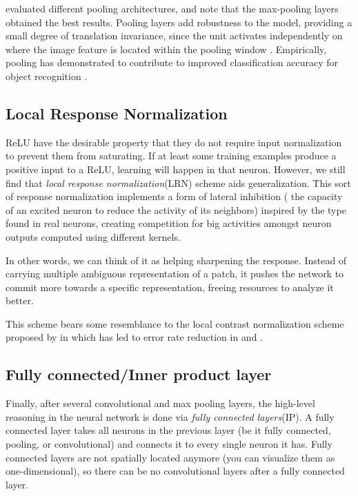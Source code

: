 \citealt{scherer2010evaluation} evaluated different pooling architectures, and note that the max-pooling layers obtained the best results. Pooling layers add robustness to the model, providing a small degree of translation invariance, since the unit activates independently on where the image feature is located within the pooling window \cite{bengio2013deep}. Empirically, pooling has demonstrated to contribute to improved classification accuracy for object recognition \cite{lecun1989backpropagation}.


\subsection{Local Response Normalization}

ReLU have the desirable property that they do not require input normalization to prevent them from saturating. If at least some training examples produce a positive input to a ReLU, learning will happen in that neuron. However, we still find that \textit{local response normalization}(LRN) scheme aids generalization. This sort of response normalization implements a form of lateral inhibition ( the capacity of an excited neuron to reduce the activity of its neighbors) inspired by the type found in real neurons, creating competition for big activities amongst neuron outputs computed using different kernels\cite{krizhevsky2012imagenet}. 

In other words, we can think of it as helping sharpening the response. Instead of carrying multiple ambiguous representation of a patch, it pushes the network to commit more towards a specific representation, freeing resources to analyze it better.

\indent This scheme bears some resemblance to the local contrast normalization scheme proposed by \citeauthor{jarrett2009best} in \cite{jarrett2009best} which has led to error rate reduction in \cite{krizhevsky2012imagenet} and \cite{hinton2012improving}. 

\subsection{Fully connected/Inner product layer}

Finally, after several convolutional and max pooling layers, the high-level reasoning in the neural network is done via \textit{fully connected layers}(IP). A fully connected layer takes all neurons in the previous layer (be it fully connected, pooling, or convolutional) and connects it to every single neuron it has. Fully connected layers are not spatially located anymore (you can visualize them as one-dimensional), so there can be no convolutional layers after a fully connected layer. 




